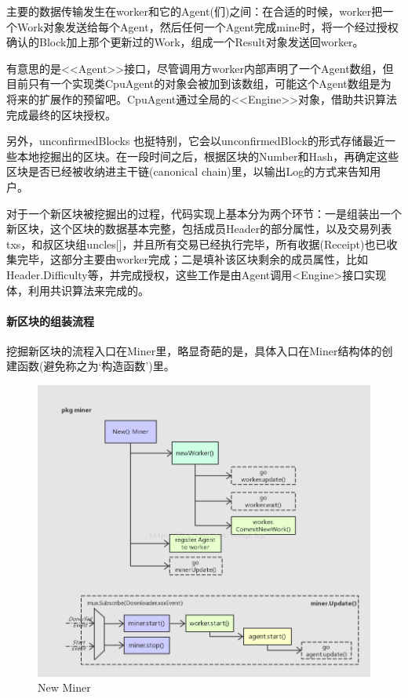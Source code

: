 \documentclass[UTF8]{ctexart}
\begin{document}
主要的数据传输发生在worker和它的Agent(们)之间：在合适的时候，worker把一个Work对象发送给每个Agent，然后任何一个Agent完成mine时，将一个经过授权确认的Block加上那个更新过的Work，组成一个Result对象发送回worker。

有意思的是<<Agent>>接口，尽管调用方worker内部声明了一个Agent数组，但目前只有一个实现类CpuAgent的对象会被加到该数组，可能这个Agent数组是为将来的扩展作的预留吧。CpuAgent通过全局的<<Engine>>对象，借助共识算法完成最终的区块授权。

另外，unconfirmedBlocks 也挺特别，它会以unconfirmedBlock的形式存储最近一些本地挖掘出的区块。在一段时间之后，根据区块的Number和Hash，再确定这些区块是否已经被收纳进主干链(canonical chain)里，以输出Log的方式来告知用户。

对于一个新区块被挖掘出的过程，代码实现上基本分为两个环节：一是组装出一个新区块，这个区块的数据基本完整，包括成员Header的部分属性，以及交易列表txs，和叔区块组uncles[]，并且所有交易已经执行完毕，所有收据(Receipt)也已收集完毕，这部分主要由worker完成；二是填补该区块剩余的成员属性，比如Header.Difficulty等，并完成授权，这些工作是由Agent调用<Engine>接口实现体，利用共识算法来完成的。

\paragraph{新区块的组装流程}

挖掘新区块的流程入口在Miner里，略显奇葩的是，具体入口在Miner结构体的创建函数(避免称之为‘构造函数’)里。

\begin{figure}
	\centering
	\includegraphics[scale=0.5]{newMiner.png}
	\caption{New Miner}
	\label{newMiner}
\end{figure}
\end{document}
